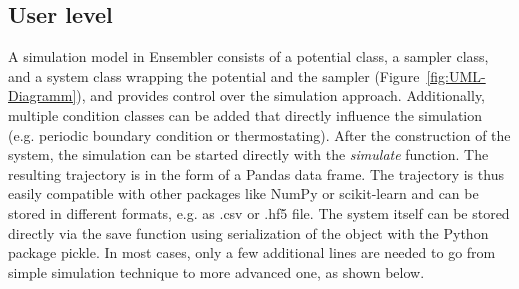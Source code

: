 \subsection{User level}
 A simulation model in Ensembler consists of a potential class, a sampler class, and a system class wrapping the potential and the sampler (Figure~\ref{fig:UML-Diagramm}), and provides control over the simulation approach. 
Additionally, multiple condition classes can be added that directly influence the simulation (e.g. periodic boundary condition\cite{Cheatham1995, Leach2001} or  thermostating\cite{Andersen1980}). 
After the construction of the system, the simulation can be started directly with the \textit{simulate} function. 
The resulting trajectory is in the form of a Pandas data frame.\cite{Mckinney2010} The trajectory is thus easily compatible with other packages like NumPy\cite{Vanderwalt2011} or scikit-learn\cite{Pedregosa2011} and can be stored in different formats, e.g. as .csv or .hf5 file. The system itself can be stored directly via the save function using serialization of the object with the Python package pickle.
In most cases, only a few additional lines are needed to go from simple simulation technique to more advanced one, as shown below. 

